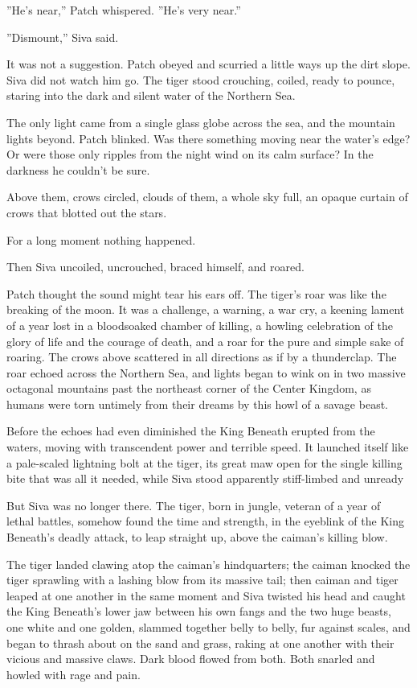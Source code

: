 \documentclass[12pt]{book}
\begin{document}
''He's near,'' Patch whispered. ''He's very near.''

''Dismount,'' Siva said.

It was not a suggestion. Patch obeyed and scurried a little ways up the dirt slope. Siva did not watch him go. The tiger stood crouching, coiled, ready to pounce, staring into the dark and silent water of the Northern Sea.

The only light came from a single glass globe across the sea, and the mountain lights beyond. Patch blinked. Was there something moving near the water's edge? Or were those only ripples from the night wind on its calm surface? In the darkness he couldn't be sure.

Above them, crows circled, clouds of them, a whole sky full, an opaque curtain of crows that blotted out the stars.

For a long moment nothing happened.

Then Siva uncoiled, uncrouched, braced himself, and roared.

Patch thought the sound might tear his ears off. The tiger's roar was like the breaking of the moon. It was a challenge, a warning, a war cry, a keening lament of a year lost in a bloodsoaked chamber of killing, a howling celebration of the glory of life and the courage of death, and a roar for the pure and simple sake of roaring. The crows above scattered in all directions as if by a thunderclap. The roar echoed across the Northern Sea, and lights began to wink on in two massive octagonal mountains past the northeast corner of the Center Kingdom, as humans were torn untimely from their dreams by this howl of a savage beast.

Before the echoes had even diminished the King Beneath erupted from the waters, moving with transcendent power and terrible speed. It launched itself like a pale-scaled lightning bolt at the tiger, its great maw open for the single killing bite that was all it needed, while Siva stood apparently stiff-limbed and unready %

But Siva was no longer there. The tiger, born in jungle, veteran of a year of lethal battles, somehow found the time and strength, in the eyeblink of the King Beneath's deadly attack, to leap straight up, above the caiman's killing blow.

The tiger landed clawing atop the caiman's hindquarters; the caiman knocked the tiger sprawling with a lashing blow from its massive tail; then caiman and tiger leaped at one another in the same moment %
and Siva twisted his head and caught the King Beneath's lower jaw between his own fangs %
and the two huge beasts, one white and one golden, slammed together belly to belly, fur against scales, and began to thrash about on the sand and grass, raking at one another with their vicious and massive claws. Dark blood flowed from both. Both snarled and howled with rage and pain.
\end{document}
